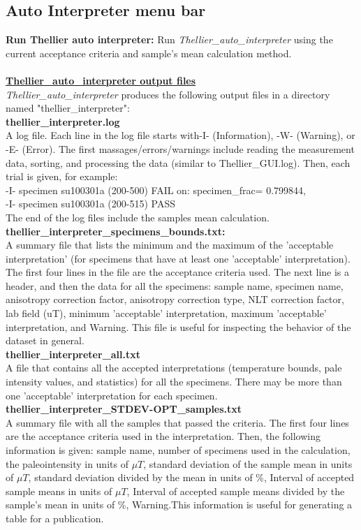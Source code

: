 \documentclass[12pt]{article}
\begin{document}
\subsection{Auto Interpreter menu bar}
{\bf Run Thellier auto interpreter:} Run  {\it Thellier\_auto\_interpreter} using the current acceptance criteria and sample's mean calculation method.\\
\\
 \underline{ \textbf{ Thellier\_auto\_interpreter output files } }\\
{\it Thellier\_auto\_interpreter} produces the following output files in a directory named "thellier\_interpreter":\\
{\bf thellier\_interpreter.log}\\
A log file. Each line in the log file starts with-I- (Information), -W- (Warning), or -E- (Error). The first massages/errors/warnings include reading the measurement data, sorting, and processing the data (similar to Thellier\_GUI.log). Then, each trial is given, for example:\\
-I- specimen su100301a (200-500) FAIL on: specimen\_frac= 0.799844, \\ 
-I- specimen su100301a (200-515) PASS\\
The end of the log files include the samples mean calculation.\\
{\bf thellier\_interpreter\_specimens\_bounds.txt:}\\
A summary file that lists the minimum and the maximum of the 'acceptable interpretation' (for specimens  that have at least one 'acceptable' interpretation). The first four lines in the file are the acceptance criteria used. The next line is a header, and then the data for all the specimens: sample name, specimen name, anisotropy correction factor, anisotropy correction type, NLT correction factor, lab field (uT), minimum 'acceptable' interpretation, maximum 'acceptable' interpretation, and Warning. This file is useful for inspecting the behavior of the dataset in general. \\
{\bf thellier\_interpreter\_all.txt}\\
A file that contains all the accepted interpretations (temperature bounds, pale intensity values, and statistics) for all the specimens. There may be more than one 'acceptable' interpretation for each specimen.\\
{\bf thellier\_interpreter\_STDEV-OPT\_samples.txt}\\
A summary file with all the samples that passed the criteria. The first four lines are the acceptance criteria used in the interpretation. Then, the following information is given: sample name, number of specimens used in the calculation, the paleointensity in units of $\mu T$,  standard deviation of the sample mean in units of $\mu T$, standard deviation divided by the mean in units of \%, Interval of accepted sample means in units of $\mu T$,  Interval of accepted sample means divided by the sample's mean in units of \%, Warning.This information is useful for generating a table for a publication. \\
\end{document}
